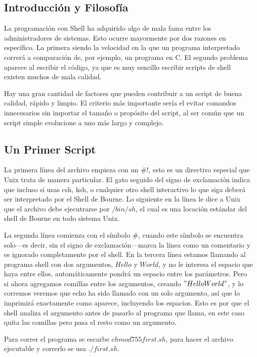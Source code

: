 \documentclass{article}
\begin{document}
\subsection{Introducción y Filosofía}
La programación con Shell ha adquirido algo de mala fama entre los administradores de sistemas. Esto ocurre mayormente por dos razones en específico. La primera siendo la velocidad en la que un programa interpretado correrá a comparación de, por ejemplo, un programa en C. El segundo problema aparece al escribir el código, ya que es muy sencillo escribir scripts de shell existen muchos de mala calidad.

Hay una gran cantidad de factores que pueden contribuir a un script de buena calidad, rápido y limpio. El criterio más importante sería el evitar comandos innecesarios sin importar el tamaño o propósito del script, al ser común que un script simple evolucione a uno más largo y complejo.

\subsection{Un Primer Script}
La primera línea del archivo empieza con un $\#!$, esto es un directivo especial que Unix trata de manera particular. El gato seguido del signo de exclamación indica que incluso si usas csh, ksh, o cualquier otro shell interactivo lo que siga deberá ser interpretado por el Shell de Bourne. Lo siguiente en la línea le dice a Unix que el archivo debe ejecutrarse por $/bin/sh$, el cual es una locación estándar del shell de Bourne en todo sistema Unix.

La segunda línea comienza con el símbolo $\#$, cuando este símbolo se encuentra solo—es decir, sin el signo de exclamación—marca la línea como un comentario y es ignorado completamente por el shell. En la tercera línea estamos llamando al programa shell con dos argumentos, $Hello$ y $World$, y no le interesa el espacio que haya entre ellos, automáticamente pondrá un espacio entre los parámetros. Pero si ahora agregamos comillas entre los argumentos, creando $"Hello    World"$, y lo corremos veremos que echo ha sido llamado con un solo argumento, así que lo imprimirá exactamente como aparece, incluyendo los espacios. Esto es por que el shell analiza el argumento antes de pasarlo al programa que llama, en este caso quita las comillas pero pasa el resto como un argumento.

Para correr el programa se escarbe $chmod 755 first.sh$, para hacer el archivo ejecutable y correrlo se usa $./first.sh$.
\end{document}
